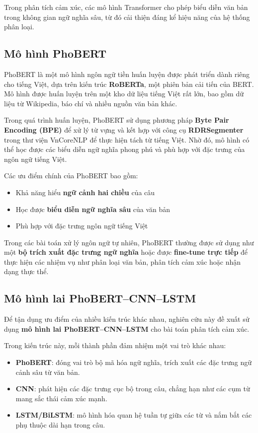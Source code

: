 \documentclass[14pt, a4paper]{report}
\begin{document}
Trong phân tích cảm xúc, các mô hình Transformer cho phép biểu diễn văn bản trong không gian ngữ nghĩa sâu, từ đó cải thiện đáng kể hiệu năng của hệ thống phân loại.

\subsection{Mô hình PhoBERT}

PhoBERT là một mô hình ngôn ngữ tiền huấn luyện được phát triển dành riêng cho tiếng Việt, dựa trên kiến trúc \textbf{RoBERTa}, một phiên bản cải tiến của BERT. Mô hình được huấn luyện trên một kho dữ liệu tiếng Việt rất lớn, bao gồm dữ liệu từ Wikipedia, báo chí và nhiều nguồn văn bản khác.

Trong quá trình huấn luyện, PhoBERT sử dụng phương pháp \textbf{Byte Pair Encoding (BPE)} để xử lý từ vựng và kết hợp với công cụ \textbf{RDRSegmenter} trong thư viện VnCoreNLP để thực hiện tách từ tiếng Việt. Nhờ đó, mô hình có thể học được các biểu diễn ngữ nghĩa phong phú và phù hợp với đặc trưng của ngôn ngữ tiếng Việt.

Các ưu điểm chính của PhoBERT bao gồm:

\begin{itemize}
    \item Khả năng hiểu \textbf{ngữ cảnh hai chiều} của câu
    \item Học được \textbf{biểu diễn ngữ nghĩa sâu} của văn bản
    \item Phù hợp với đặc trưng ngôn ngữ tiếng Việt
\end{itemize}

Trong các bài toán xử lý ngôn ngữ tự nhiên, PhoBERT thường được sử dụng như một \textbf{bộ trích xuất đặc trưng ngữ nghĩa} hoặc được \textbf{fine-tune trực tiếp} để thực hiện các nhiệm vụ như phân loại văn bản, phân tích cảm xúc hoặc nhận dạng thực thể.

\subsection{Mô hình lai PhoBERT--CNN--LSTM}

Để tận dụng ưu điểm của nhiều kiến trúc khác nhau, nghiên cứu này đề xuất sử dụng \textbf{mô hình lai PhoBERT--CNN--LSTM} cho bài toán phân tích cảm xúc.

Trong kiến trúc này, mỗi thành phần đảm nhiệm một vai trò khác nhau:

\begin{itemize}
    \item \textbf{PhoBERT}: đóng vai trò bộ mã hóa ngữ nghĩa, trích xuất các đặc trưng ngữ cảnh sâu từ văn bản.
    \item \textbf{CNN}: phát hiện các đặc trưng cục bộ trong câu, chẳng hạn như các cụm từ mang sắc thái cảm xúc mạnh.
    \item \textbf{LSTM/BiLSTM}: mô hình hóa quan hệ tuần tự giữa các từ và nắm bắt các phụ thuộc dài hạn trong câu.
\end{itemize}
\end{document}
